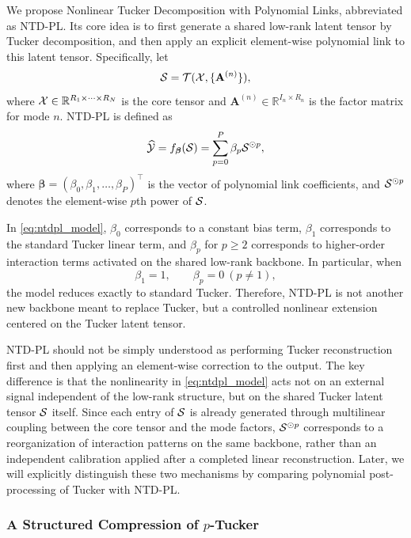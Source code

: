We propose Nonlinear Tucker Decomposition with Polynomial Links, abbreviated as NTD-PL. Its core idea is to first generate a shared low-rank latent tensor by Tucker decomposition, and then apply an explicit element-wise polynomial link to this latent tensor. Specifically, let
\begin{equation}
\label{eq:ntdpl_latent_tensor}
\mathcal{S}
=
\mathcal{T}(\mathcal{X},\{\mathbf{A}^{(n)}\}),
\end{equation}
where $\mathcal{X}\in\mathbb R^{R_1\times\cdots\times R_N}$ is the core tensor and $\mathbf A^{(n)}\in\mathbb R^{I_n\times R_n}$ is the factor matrix for mode $n$. NTD-PL is defined as
\begin{equation}
\label{eq:ntdpl_model}
\widehat{\mathcal{Y}}
=
 f_{\boldsymbol\beta}(\mathcal{S})
=
\sum_{p=0}^{P} \beta_p \mathcal{S}^{\odot p},
\end{equation}
where $\boldsymbol\beta=(\beta_0,\beta_1,\dots,\beta_P)^\top$ is the vector of polynomial link coefficients, and $\mathcal{S}^{\odot p}$ denotes the element-wise $p$th power of $\mathcal{S}$.

In \eqref{eq:ntdpl_model}, $\beta_0$ corresponds to a constant bias term, $\beta_1$ corresponds to the standard Tucker linear term, and $\beta_p$ for $p\ge 2$ corresponds to higher-order interaction terms activated on the shared low-rank backbone. In particular, when
\begin{equation}
\beta_1=1,\qquad \beta_p=0\ (p\neq 1),
\end{equation}
the model reduces exactly to standard Tucker. Therefore, NTD-PL is not another new backbone meant to replace Tucker, but a controlled nonlinear extension centered on the Tucker latent tensor.

NTD-PL should not be simply understood as performing Tucker reconstruction first and then applying an element-wise correction to the output. The key difference is that the nonlinearity in \eqref{eq:ntdpl_model} acts not on an external signal independent of the low-rank structure, but on the shared Tucker latent tensor $\mathcal{S}$ itself. Since each entry of $\mathcal{S}$ is already generated through multilinear coupling between the core tensor and the mode factors, $\mathcal{S}^{\odot p}$ corresponds to a reorganization of interaction patterns on the same backbone, rather than an independent calibration applied after a completed linear reconstruction. Later, we will explicitly distinguish these two mechanisms by comparing polynomial post-processing of Tucker with NTD-PL.

\subsubsection{A Structured Compression of $p$-Tucker}


